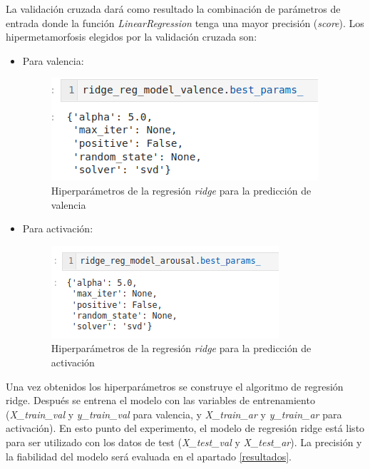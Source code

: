 \documentclass[12pt,a4paper,Spanish]{article}
\begin{document}
La validación cruzada dará como resultado la combinación de parámetros de entrada donde la función \textit{LinearRegression} tenga una mayor precisión (\textit{score}). Los hipermetamorfosis elegidos por la validación cruzada son:
\begin{itemize}
	\item Para valencia:
	\begin{figure}[H]
		\centering
		\includegraphics[width=0.5\linewidth]{figs/final_params_ridge_valence}
		\caption{Hiperparámetros de la regresión \textit{ridge} para la predicción de valencia}
		\label{fig:finalparamsridgevalence}
	\end{figure}
	\item Para activación:
	\begin{figure}[H]
		\centering
		\includegraphics[width=0.7\linewidth]{figs/final_params_ridge_arousal}
		\caption{Hiperparámetros de la regresión \textit{ridge} para la predicción de activación}
		\label{fig:finalparamsridgearousal}
	\end{figure}
	
\end{itemize}
Una vez obtenidos los hiperparámetros se construye el algoritmo de regresión ridge. Después se entrena el modelo con las variables de entrenamiento (\textit{X\_train\_val} y \textit{y\_train\_val} para valencia, y \textit{X\_train\_ar} y \textit{y\_train\_ar} para activación).
\newline
En esto punto del experimento, el modelo de regresión ridge está listo para ser utilizado con los datos de test (\textit{X\_test\_val} y \textit{X\_test\_ar}). La precisión y la fiabilidad del modelo será evaluada en el apartado \ref{resultados}.
\end{document}
